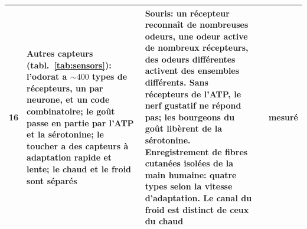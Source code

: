{\begin{longtable}{>{\raggedright}p{0.5cm}>{\raggedright}p{4.0cm}>{\raggedright}p{5.6cm}>{\raggedright}p{2.3cm}>{\raggedright\arraybackslash}p{1.7cm}}
16 & Autres capteurs (tabl.~\ref{tab:sensors}): l'odorat a $\sim400$ types de récepteurs, un par neurone, et un code combinatoire; le goût passe en partie par l'ATP et la sérotonine; le toucher a des capteurs à adaptation rapide et lente; le chaud et le froid sont séparés & Souris: un récepteur reconnaît de nombreuses odeurs, une odeur active de nombreux récepteurs, des odeurs différentes activent des ensembles différents. Sans récepteurs de l'ATP, le nerf gustatif ne répond pas; les bourgeons du goût libèrent de la sérotonine. Enregistrement de fibres cutanées isolées de la main humaine: quatre types selon la vitesse d'adaptation. Le canal du froid est distinct de ceux du chaud & \cite{Mombaerts2004,Malnic1999,Finger2005,Huang2005,JohanssonVallbo1979,McKemy2002} & mesuré \\
\bottomrule
\end{longtable}}
